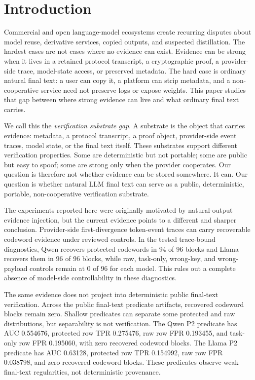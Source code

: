\section{Introduction}
\label{sec:intro}

Commercial and open language-model ecosystems create recurring disputes about
model reuse, derivative services, copied outputs, and suspected distillation.
The hardest cases are not cases where no evidence can exist.  Evidence can be
strong when it lives in a retained protocol transcript, a cryptographic proof,
a provider-side trace, model-state access, or preserved metadata.  The hard
case is ordinary natural final text: a user can copy it, a platform can strip
metadata, and a non-cooperative service need not preserve logs or expose
weights.  This paper studies that gap between where strong evidence can live
and what ordinary final text carries.

We call this the \emph{verification substrate gap}.  A substrate is the object
that carries evidence: metadata, a protocol transcript, a proof object,
provider-side event traces, model state, or the final text itself.  These
substrates support different verification properties.  Some are deterministic
but not portable; some are public but easy to spoof; some are strong only when
the provider cooperates.  Our question is therefore not whether evidence can be
stored somewhere.  It can.  Our question is whether natural LLM final text can
serve as a public, deterministic, portable, non-cooperative verification
substrate.

The experiments reported here were originally motivated by natural-output
evidence injection, but the current evidence points to a different and sharper
conclusion.  Provider-side first-divergence token-event traces can carry
recoverable codeword evidence under reviewed controls.  In the tested
trace-bound diagnostics, Qwen recovers protected codewords in 94 of 96 blocks
and Llama recovers them in 96 of 96 blocks, while raw, task-only, wrong-key,
and wrong-payload controls remain at 0 of 96 for each model.  This rules out a
complete absence of model-side controllability in these diagnostics.

The same evidence does not project into deterministic public final-text
verification.  Across the public final-text predicate artifacts, recovered
codeword blocks remain zero.  Shallow predicates can separate some protected
and raw distributions, but separability is not verification.  The Qwen P2
predicate has AUC 0.554676, protected row TPR 0.275476, raw row FPR 0.193455,
and task-only row FPR 0.195060, with zero recovered codeword blocks.  The Llama
P2 predicate has AUC 0.63128, protected row TPR 0.154992, raw row FPR 0.038798,
and zero recovered codeword blocks.  These predicates observe weak final-text
regularities, not deterministic provenance.

